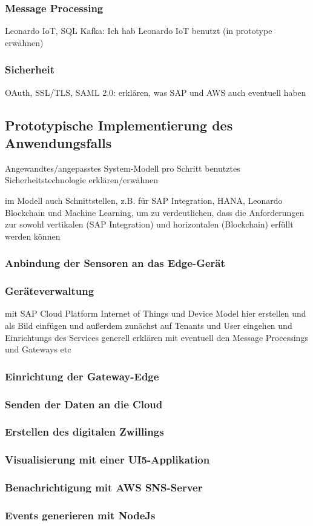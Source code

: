 \subsubsection{Message Processing}
Leonardo IoT, SQL Kafka: Ich hab Leonardo IoT benutzt (in prototype erwähnen)

\subsubsection{Sicherheit}
OAuth, SSL/TLS, SAML 2.0: erklären, was SAP und AWS auch eventuell haben

\subsection{Prototypische Implementierung des Anwendungsfalls}
Angewandtes/angepasstes System-Modell
pro Schritt benutztes Sicherheitstechnologie erklären/erwähnen

im Modell auch Schnittstellen, z.B. für SAP Integration, HANA, Leonardo Blockchain und Machine Learning, um zu verdeutlichen, dass die Anforderungen zur sowohl vertikalen (SAP Integration) und horizontalen (Blockchain) erfüllt werden können

\subsubsection{Anbindung der Sensoren an das Edge-Gerät}

\subsubsection{Geräteverwaltung}
mit SAP Cloud Platform Internet of Things und Device Model hier erstellen und als Bild einfügen und außerdem
zunächst auf Tenants und User eingehen und Einrichtungs des Services generell erklären mit eventuell den Message Processings
und Gateways etc

\subsubsection{Einrichtung der Gateway-Edge}

\subsubsection{Senden der Daten an die Cloud}

\subsubsection{Erstellen des digitalen Zwillings}

\subsubsection{Visualisierung mit einer UI5-Applikation}

\subsubsection{Benachrichtigung mit AWS SNS-Server}

\subsubsection{Events generieren mit NodeJs}

\newpage
